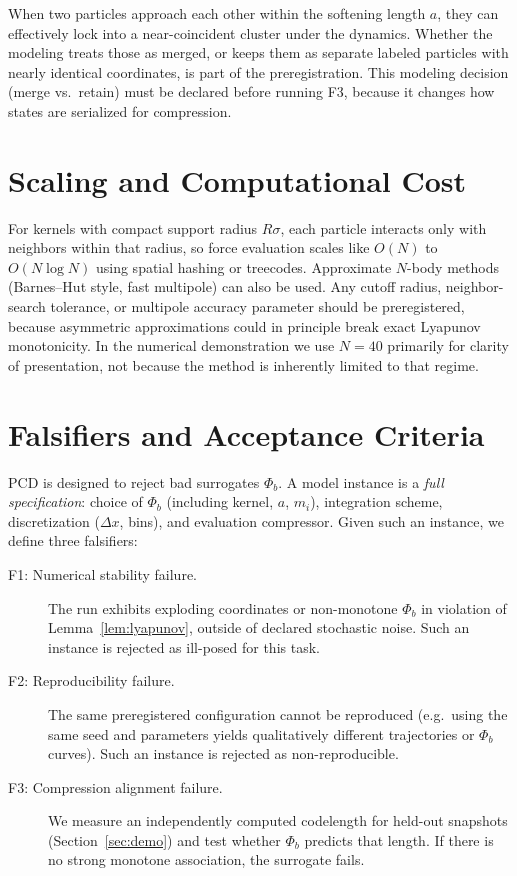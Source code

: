 \documentclass[11pt]{article}
\begin{document}
When two particles approach each other within the softening length $a$, they can effectively lock into a near-coincident cluster under the dynamics.
Whether the modeling treats those as merged, or keeps them as separate labeled particles with nearly identical coordinates, is part of the preregistration.
This modeling decision (merge vs.\ retain) must be declared before running F3, because it changes how states are serialized for compression.

\section{Scaling and Computational Cost}
For kernels with compact support radius $R\sigma$, each particle interacts only with neighbors within that radius, so force evaluation scales like $O(N)$ to $O(N\log N)$ using spatial hashing or treecodes.
Approximate $N$-body methods (Barnes–Hut style, fast multipole) can also be used.
Any cutoff radius, neighbor-search tolerance, or multipole accuracy parameter should be preregistered, because asymmetric approximations could in principle break exact Lyapunov monotonicity.
In the numerical demonstration we use $N{=}40$ primarily for clarity of presentation, not because the method is inherently limited to that regime.

\section{Falsifiers and Acceptance Criteria}
\label{sec:falsifiers}
PCD is designed to reject bad surrogates $\Phi_b$.
A model instance is a \emph{full specification}: choice of $\Phi_b$ (including kernel, $a$, $m_i$), integration scheme, discretization ($\Delta x$, bins), and evaluation compressor.
Given such an instance, we define three falsifiers:

\begin{description}
    \item[F1: Numerical stability failure.]  
    The run exhibits exploding coordinates or non-monotone $\Phi_b$ in violation of Lemma~\ref{lem:lyapunov}, outside of declared stochastic noise. Such an instance is rejected as ill-posed for this task.

    \item[F2: Reproducibility failure.]  
    The same preregistered configuration cannot be reproduced (e.g.\ using the same seed and parameters yields qualitatively different trajectories or $\Phi_b$ curves). Such an instance is rejected as non-reproducible.

    \item[F3: Compression alignment failure.]  
    We measure an independently computed codelength for held-out snapshots (Section~\ref{sec:demo}) and test whether $\Phi_b$ predicts that length. If there is no strong monotone association, the surrogate fails.
\end{description}
\end{document}
